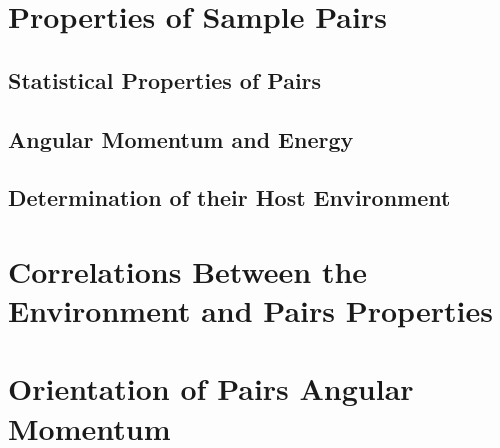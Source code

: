 



\section{Properties of Sample Pairs}
\label{sec:PropertiesOfSamplePairs}


	\subsection{Statistical Properties of Pairs}
	\label{subsec:StatisticalPropertiesOfPairs}


	\subsection{Angular Momentum and Energy}
	\label{subsec:AngularMomentumAndEnergy}


	\subsection{Determination of their Host Environment}
	\label{subsec:DeterminationOfTheirHostEnvironment}
	
	



\section{Correlations Between the Environment and Pairs Properties}
\label{sec:CorrelationsBetweenTheEnvironmentAndPairsProperties}




\section{Orientation of Pairs Angular Momentum}
\label{sec:OrientationOfPairsAngularMomentum}
